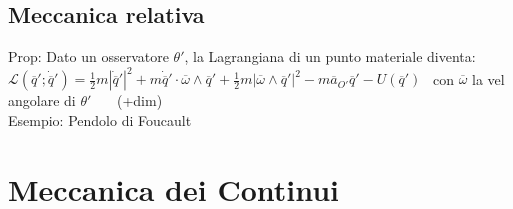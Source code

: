\documentclass{article}
\theoremstyle{unnumbered}
\theoremstyle{unnumbered1}
\begin{document}
\subsection{Meccanica relativa}
%
Prop: Dato un osservatore $\theta'$, la Lagrangiana di un punto materiale diventa: \\ 
\phantom{Prop: }$\mathcal{L}(\overline{q}';\dot{\overline{q}}')=\frac{1}{2}m|\dot{\overline{q}}'|^2 + m\dot{\overline{q}}'\cdot\overline{\omega}\wedge\overline{q}' + \frac{1}{2}m|\overline{\omega}\wedge\overline{q}'|^2 -m\overline{a}_{O'}\overline{q}'-U(\overline{q}')$ \ con $\overline{\omega}$ la vel angolare di $\theta'$ \ \ \ (+dim)\\
%
%
%
Esempio: Pendolo di Foucault \\
%
%
%
\section{Meccanica dei Continui}

\end{document}
